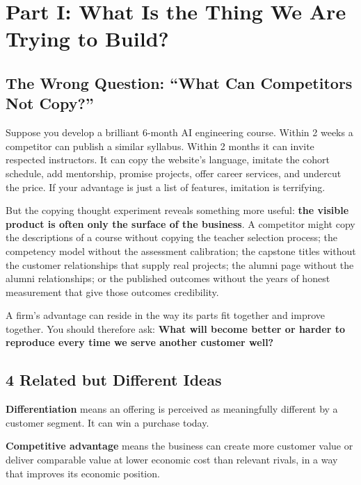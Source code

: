 \section*{Part I: What Is the Thing We Are Trying to Build?}
\label{sec:part1_what_are_we_trying_to_build}

\subsection{The Wrong Question: ``What Can Competitors Not Copy?''}
\label{sec:wrong_question_what_cant_copy}

Suppose you develop a brilliant 6-month AI engineering course. Within 2 weeks a competitor can publish a similar syllabus. Within 2 months it can invite respected instructors. It can copy the website's language, imitate the cohort schedule, add mentorship, promise projects, offer career services, and undercut the price. If your advantage is just a list of features, imitation is terrifying.

But the copying thought experiment reveals something more useful: \textbf{the visible product is often only the surface of the business}. A competitor might copy the descriptions of a course without copying the teacher selection process; the competency model without the assessment calibration; the capstone titles without the customer relationships that supply real projects; the alumni page without the alumni relationships; or the published outcomes without the years of honest measurement that give those outcomes credibility.

A firm's advantage can reside in the way its parts fit together and improve together. You should therefore ask: \textbf{What will become better or harder to reproduce every time we serve another customer well?}

\subsection{4 Related but Different Ideas}
\label{sec:four_related_ideas}

\textbf{Differentiation} means an offering is perceived as meaningfully different by a customer segment. It can win a purchase today.

\textbf{Competitive advantage} means the business can create more customer value or deliver comparable value at lower economic cost than relevant rivals, in a way that improves its economic position.

